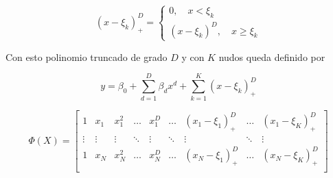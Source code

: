 \begin{itemize}
    \begin{equation}
        (x-\xi_k)_+^D = \left\{\begin{matrix}
        0,\quad x < \xi_k\\
        (x-\xi_k)^D,\quad x \geq \xi_k
        \end{matrix}\right.
    \end{equation}
    
    Con esto polinomio truncado de grado $D$ y con $K$ nudos queda definido por
    
    \begin{equation}
        y = \beta_0 + \sum_{d=1}^D\beta_dx^d+\sum_{k=1}^K(x-\xi_k)_+^D
    \end{equation}
    
    \begin{equation}
        \Phi(X) = \left[ \begin{matrix} 1 & x_1 & x_1^2 & \ldots & x_1^D & \ldots & (x_1-\xi_1)_+^D & \ldots & (x_1-\xi_K)_+^D \\
        \vdots & \vdots & \vdots & \ddots & \vdots & \ddots & \vdots & \ddots & \vdots\\
        1 & x_N & x_N^2 & \ldots & x_N^D & \ldots & (x_N-\xi_1)_+^D & \ldots & (x_N-\xi_K)_+^D \\
        \end{matrix} \right]
    \end{equation}
    
\end{itemize}















